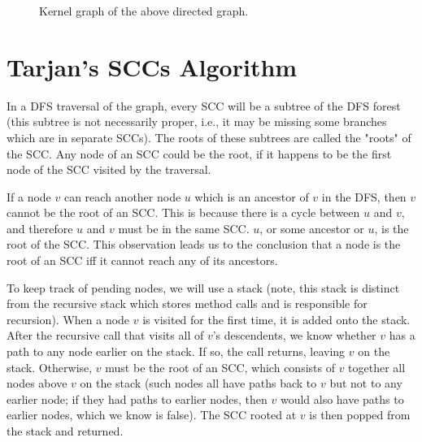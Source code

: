 \documentclass{article}
\begin{document}
\begin{figure}[h]
\center
{}
\caption{Kernel graph of the above directed graph.}
\end{figure}

\newpage
\section{Tarjan's SCCs Algorithm}

In a DFS traversal of the graph, every SCC will be a subtree of the DFS forest (this subtree is not necessarily proper, i.e., it may be missing some branches which are in separate SCCs). The roots of these subtrees are called the "roots" of the SCC. Any node of an SCC could be the root, if it happens to be the first node of the SCC visited by the traversal.

If a node $v$ can reach another node $u$ which is an ancestor of $v$ in the DFS, then $v$ cannot be the root of an SCC. This is because there is a cycle between $u$ and $v$, and therefore $u$ and $v$ must be in the same SCC. $u$, or some ancestor or $u$, is the root of the SCC. This observation leads us to the conclusion that a node is the root of an SCC iff it cannot reach any of its ancestors.

To keep track of pending nodes, we will use a stack (note, this stack is distinct from the recursive stack which stores method calls and is responsible for recursion). When a node $v$ is visited for the first time, it is added onto the stack. After the recursive call that visits all of $v$'s descendents, we know whether $v$ has a path to any node earlier on the stack. If so, the call returns, leaving $v$ on the stack. Otherwise, $v$ must be the root of an SCC, which consists of $v$ together all nodes above $v$ on the stack (such nodes all have paths back to $v$ but not to any earlier node; if they had paths to earlier nodes, then $v$ would also have paths to earlier nodes, which we know is false). The SCC rooted at $v$ is then popped from the stack and returned.
\end{document}
